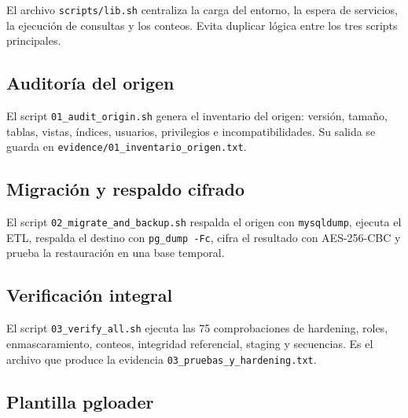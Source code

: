 El archivo \texttt{scripts/lib.sh} centraliza la carga del entorno, la espera
de servicios, la ejecución de consultas y los conteos. Evita duplicar lógica
entre los tres scripts principales.



\subsection{Auditoría del origen}

El script \texttt{01\_audit\_origin.sh} genera el inventario del origen:
versión, tamaño, tablas, vistas, índices, usuarios, privilegios e
incompatibilidades. Su salida se guarda en
\texttt{evidence/01\_inventario\_origen.txt}.



\subsection{Migración y respaldo cifrado}

El script \texttt{02\_migrate\_and\_backup.sh} respalda el origen con
\texttt{mysqldump}, ejecuta el ETL, respalda el destino con \texttt{pg\_dump
-Fc}, cifra el resultado con AES-256-CBC y prueba la restauración en una base
temporal.



\subsection{Verificación integral}

El script \texttt{03\_verify\_all.sh} ejecuta las 75 comprobaciones de
hardening, roles, enmascaramiento, conteos, integridad referencial, staging y
secuencias. Es el archivo que produce la evidencia
\texttt{03\_pruebas\_y\_hardening.txt}.



\subsection{Plantilla pgloader}

